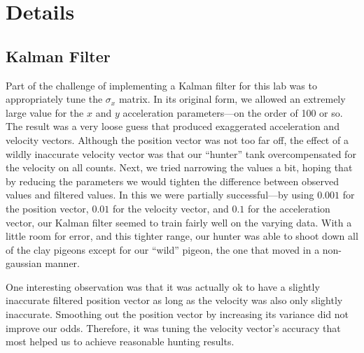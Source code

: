 \chapter{Details}\label{chap:details}
\section{Kalman Filter}
Part of the challenge of implementing a Kalman filter for this lab was to appropriately tune the $\sigma_x$ matrix.  In its original form, we allowed an extremely large value for the $x$ and $y$ acceleration parameters---on the order of 100 or so.  The result was a very loose guess that produced exaggerated acceleration and velocity vectors.  Although the position vector was not too far off, the effect of a wildly inaccurate velocity vector was that our ``hunter'' tank overcompensated for the velocity on all counts.  Next, we tried narrowing the values a bit, hoping that by reducing the parameters we would tighten the difference between observed values and filtered values.  In this we were partially successful---by using $0.001$ for the position vector, $0.01$ for the velocity vector, and $0.1$ for the acceleration vector, our Kalman filter seemed to train fairly well on the varying data.  With a little room for error, and this tighter range, our hunter was able to shoot down all of the clay pigeons except for our ``wild'' pigeon, the one that moved in a non-gaussian manner.

One interesting observation was that it was actually ok to have a slightly inaccurate filtered position vector as long as the velocity was also only slightly inaccurate.  Smoothing out the position vector by increasing its variance did not improve our odds.  Therefore, it was tuning the velocity vector's accuracy that most helped us to achieve reasonable hunting results.

